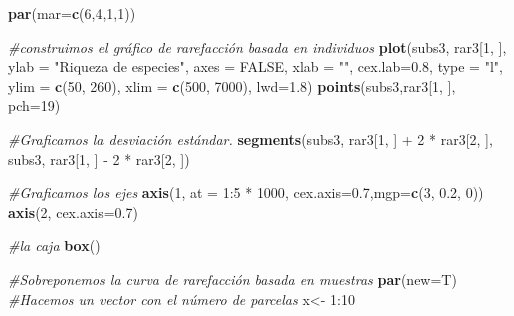 \documentclass[]{book}
\newenvironment{Shaded}{\begin{snugshade}}{\end{snugshade}}
\newcommand{\KeywordTok}[1]{\textcolor[rgb]{0.13,0.29,0.53}{\textbf{{#1}}}}
\newcommand{\DataTypeTok}[1]{\textcolor[rgb]{0.13,0.29,0.53}{{#1}}}
\newcommand{\DecValTok}[1]{\textcolor[rgb]{0.00,0.00,0.81}{{#1}}}
\newcommand{\FloatTok}[1]{\textcolor[rgb]{0.00,0.00,0.81}{{#1}}}
\newcommand{\StringTok}[1]{\textcolor[rgb]{0.31,0.60,0.02}{{#1}}}
\newcommand{\CommentTok}[1]{\textcolor[rgb]{0.56,0.35,0.01}{\textit{{#1}}}}
\newcommand{\OtherTok}[1]{\textcolor[rgb]{0.56,0.35,0.01}{{#1}}}
\newcommand{\NormalTok}[1]{{#1}}
\begin{document}
\begin{Shaded}
\begin{Highlighting}[]
\KeywordTok{par}\NormalTok{(}\DataTypeTok{mar=}\KeywordTok{c}\NormalTok{(}\DecValTok{6}\NormalTok{,}\DecValTok{4}\NormalTok{,}\DecValTok{1}\NormalTok{,}\DecValTok{1}\NormalTok{))}

\CommentTok{#construimos el gráfico de rarefacción basada en individuos}
\KeywordTok{plot}\NormalTok{(subs3, rar3[}\DecValTok{1}\NormalTok{, ], }\DataTypeTok{ylab =} \StringTok{"Riqueza de especies"}\NormalTok{, }
          \DataTypeTok{axes =} \OtherTok{FALSE}\NormalTok{, }\DataTypeTok{xlab =} \StringTok{""}\NormalTok{, }\DataTypeTok{cex.lab=}\FloatTok{0.8}\NormalTok{, }
        \DataTypeTok{type =} \StringTok{"l"}\NormalTok{, }\DataTypeTok{ylim =} \KeywordTok{c}\NormalTok{(}\DecValTok{50}\NormalTok{, }\DecValTok{260}\NormalTok{), }\DataTypeTok{xlim =} \KeywordTok{c}\NormalTok{(}\DecValTok{500}\NormalTok{, }\DecValTok{7000}\NormalTok{), }\DataTypeTok{lwd=}\FloatTok{1.8}\NormalTok{)}
\KeywordTok{points}\NormalTok{(subs3,rar3[}\DecValTok{1}\NormalTok{, ], }\DataTypeTok{pch=}\DecValTok{19}\NormalTok{)}

\CommentTok{#Graficamos la desviación estándar.}
\KeywordTok{segments}\NormalTok{(subs3, rar3[}\DecValTok{1}\NormalTok{, ] +}\StringTok{ }\DecValTok{2} \NormalTok{*}\StringTok{ }\NormalTok{rar3[}\DecValTok{2}\NormalTok{, ], }
         \NormalTok{subs3, rar3[}\DecValTok{1}\NormalTok{, ] -}\StringTok{ }\DecValTok{2} \NormalTok{*}\StringTok{ }\NormalTok{rar3[}\DecValTok{2}\NormalTok{, ])}

\CommentTok{#Graficamos los ejes}
\KeywordTok{axis}\NormalTok{(}\DecValTok{1}\NormalTok{, }\DataTypeTok{at =} \DecValTok{1}\NormalTok{:}\DecValTok{5} \NormalTok{*}\StringTok{ }\DecValTok{1000}\NormalTok{, }\DataTypeTok{cex.axis=}\FloatTok{0.7}\NormalTok{,}\DataTypeTok{mgp=}\KeywordTok{c}\NormalTok{(}\DecValTok{3}\NormalTok{, }\FloatTok{0.2}\NormalTok{, }\DecValTok{0}\NormalTok{)) }
\KeywordTok{axis}\NormalTok{(}\DecValTok{2}\NormalTok{, }\DataTypeTok{cex.axis=}\FloatTok{0.7}\NormalTok{) }

\CommentTok{#la caja}
\KeywordTok{box}\NormalTok{() }

\CommentTok{#Sobreponemos la curva de rarefacción basada en muestras}
\KeywordTok{par}\NormalTok{(}\DataTypeTok{new=}\NormalTok{T)}
\CommentTok{#Hacemos un vector con el número de parcelas}
\NormalTok{x<-}\StringTok{ }\DecValTok{1}\NormalTok{:}\DecValTok{10}


\end{Highlighting}
\end{Shaded}
\end{document}
